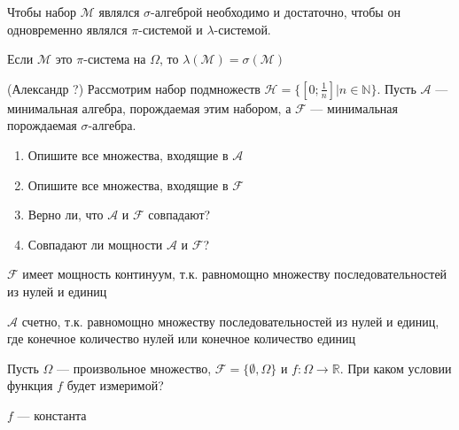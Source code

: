 \begin{problem}
Чтобы набор $\mathcal{M}$ являлся $\sigma$-алгеброй необходимо и
достаточно, чтобы он одновременно являлся $\pi$-системой и
$\lambda$-системой. 
\end{problem} 
\begin{solution} 

\end{solution}

\begin{problem}
Если $\mathcal{M}$ это $\pi$-система на $\Omega$, то
$\lambda(\mathcal{M})=\sigma(\mathcal{M})$ 
\end{problem} 
\begin{solution} 

\end{solution}

\begin{problem}
(Александр ?) Рассмотрим набор подмножеств
$\mathcal{H}=\{[0;\frac{1}{n}]|n\in \mathbb{N}\}$. Пусть
$\mathcal{A}$ --- минимальная алгебра, порождаемая этим набором, а
$\mathcal{F}$ --- минимальная
порождаемая $\sigma$-алгебра. 
\begin{enumerate}
\item Опишите все множества, входящие в $\mathcal{A}$ 
\item  Опишите все множества, входящие в $\mathcal{F}$ 
\item  Верно ли, что $\mathcal{A}$ и $\mathcal{F}$ совпадают? 
\item Совпадают ли мощности $\mathcal{A}$ и $\mathcal{F}$?
\end{enumerate}

\end{problem} 
\begin{solution} 

$\mathcal{F}$ имеет мощность континуум, т.к. равномощно множеству последовательностей из нулей и единиц

$\mathcal{A}$ счетно, т.к. равномощно множеству последовательностей из нулей и единиц, где конечное количество нулей или конечное количество единиц

\end{solution}

\begin{problem}
Пусть $\Omega$ --- произвольное множество,
$\mathcal{F}=\{\emptyset,\Omega\}$ и $f:\Omega\rightarrow
\mathbb{R}$. При
каком условии функция $f$ будет измеримой? 
\end{problem} 
\begin{solution} 
$f$ --- константа
\end{solution}

